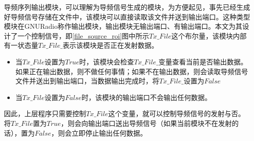 导频序列输出模块，可以理解为导频信号生成的模块，为方便起见，事先已经生成好导频信号存储在文件中，该模块可以直接读取该文件并送到输出端口。这种类型模块在GNURadio称作输出模块，输出模块无输出端口、有输出端口。本文为其设计了一个控制信号，即\ref{file_source_roi}图中所示$Tx\_File$这个布尔量，该模块内部有一状态量$Tx\_File\_$表示该模块是否正在发射数据。

\begin{itemize}
    \item 当$Tx\_File$设置为$True$时，该模块会检查$Tx\_File\_$变量查看当前是否输出数据。如果正在输出数据，则不做任何事情；如果不在输出数据，则会读取导频信号文件并送出到输出端口，当数据输出完成时，将$Tx\_File\_$设置为$False$
    \item 当$Tx\_File$设置为$False$时，该模块的输出端口不会输出任何数据。
\end{itemize}

因此，上层程序只需要控制$Tx\_File$这个变量，就可以控制导频信号的发射与否。将$Tx\_File$置为$True$，则会向输出端口送出导频信号（如果当前模块不在发射的话），置为$False$，则会立即停止输出任何数据。

